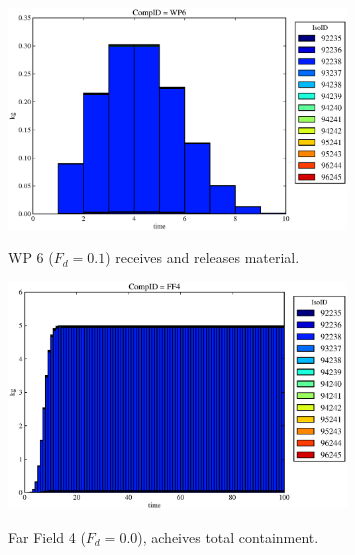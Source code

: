 \begin{frame}
\begin{figure}
\begin{minipage}[b]{0.45\linewidth}
\end{minipage}
\hspace{0.05\linewidth}
\begin{minipage}[b]{0.45\linewidth}
  \includegraphics[width=0.8\textwidth]{./images/drIV2.eps}
  \caption[Case DRIV WP Contaminants.]{ 
    WP 6 ($F_d = 0.1$) receives and releases material. 
    }
  \label{fig:drIVwp6}
  \includegraphics[width=0.8\textwidth]{./images/drIV0.eps}
  \caption[Case DRIV WP Contaminants.]{ 
    Far Field 4 ($F_d = 0.0$), acheives total containment.
    }
  \label{fig:drIVff0}


  \end{minipage}
\end{figure}
\end{frame}
